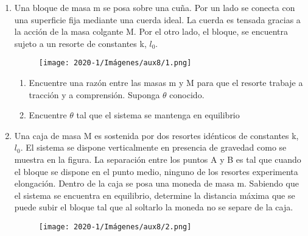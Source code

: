 \documentclass[letterpaper,11pt]{article}
\begin{document}
\vspace{-0,5cm}
\begin{enumerate}\setlength{\itemsep}{0.4cm}


\item Una bloque de masa m se posa sobre una cuña. Por un lado se conecta con una superficie fija mediante una cuerda ideal. La cuerda es tensada gracias a la acción de la masa colgante M. Por el otro lado, el bloque, se encuentra sujeto a un resorte de constantes k, $l_0$.\\
\begin{figure}[h!]
    \centering
    \texttt{[image: 2020-1/Imágenes/aux8/1.png]}
\end{figure}
\begin{enumerate}
    \item Encuentre una razón entre las masas m y M para que el resorte trabaje a tracción y a comprensión. Suponga $\theta$ conocido.
    \item Encuentre $\theta$ tal que el sistema se mantenga en equilibrio
\end{enumerate}

\item Una caja de masa M es sostenida por dos resortes idénticos de constantes k, $l_0$. El sistema se dispone verticalmente en presencia de gravedad como se muestra en la figura. La separación entre los puntos A y B es tal que cuando el bloque se dispone en el punto medio, ninguno de los resortes experimenta elongación. Dentro de la caja se posa una moneda de masa m. Sabiendo que el sistema se encuentra en equilibrio, determine la distancia máxima que se puede subir el bloque tal que al soltarlo la moneda no se separe de la caja.
\begin{figure}[h!]
    \centering
    \texttt{[image: 2020-1/Imágenes/aux8/2.png]}
\end{figure}
\end{enumerate}
\end{document}
